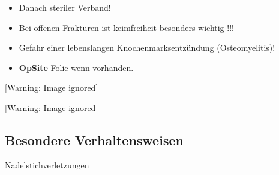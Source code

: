 \documentclass{article}
\makeatletter
\newcommand\gT[1]{\textbf{\textup{\textcolor[rgb]{0.0,0.5019608,0.0}{#1}}}}
\newcommand\captionof[1]{\def\@captype{#1}\caption}
\makeatother
\begin{document}
\begin{itemize}
\item {\mdseries
Danach steriler Verband!}

\end{itemize}
\begin{itemize}
\item {\mdseries
Bei offenen Frakturen ist keimfreiheit be\-sonders wichtig !!!}

\item {\mdseries
Gefahr einer lebenslangen Knochen\-marks\-ent\-z\"undung
(Osteomyelitis)!}

\item {\mdseries
{}\gT{OpSite}{}-Folie wenn vorhanden.}

\end{itemize}
 [Warning: Image ignored] %
\captionof{figure}[Reiningung einer sauberen Wunde: Von Innen nach
Aussen, der Tupfer wird anschliessend verworfen.]{Reiningung einer
sauberen Wunde: Von Innen nach Aussen, der Tupfer wird anschliessend
verworfen.}
 [Warning: Image ignored] %
\captionof{figure}[Anbringen einer OpSite(TM)-Folie: Es ist wichtig die
Folie zu spannen damit sie sich nicht selbst verklebt. ]{Anbringen
einer OpSite(TM)-Folie: Es ist wichtig die Folie zu spannen damit sie
sich nicht selbst verklebt. }


\subsection{Besondere Verhaltensweisen}
{\mdseries\color[rgb]{0.0,0.0,0.5019608}
%
%
Nadelstichverletzungen}
\end{document}
